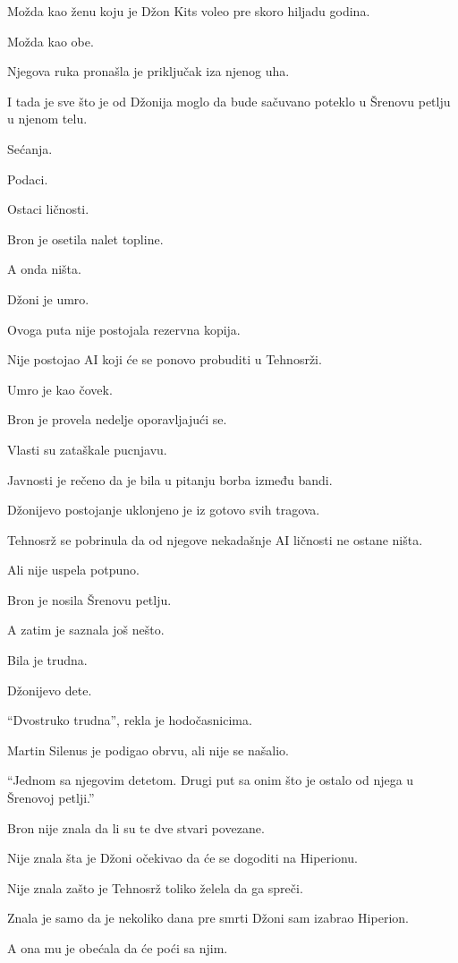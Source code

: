 Možda kao ženu koju je Džon Kits voleo pre skoro hiljadu godina.

Možda kao obe.

Njegova ruka pronašla je priključak iza njenog uha.

I tada je sve što je od Džonija moglo da bude sačuvano poteklo u Šrenovu petlju u njenom telu.

Sećanja.

Podaci.

Ostaci ličnosti.

Bron je osetila nalet topline.

A onda ništa.

Džoni je umro.

Ovoga puta nije postojala rezervna kopija.

Nije postojao AI koji će se ponovo probuditi u Tehnosrži.

Umro je kao čovek.

\bigskip

Bron je provela nedelje oporavljajući se.

Vlasti su zataškale pucnjavu.

Javnosti je rečeno da je bila u pitanju borba između bandi.

Džonijevo postojanje uklonjeno je iz gotovo svih tragova.

Tehnosrž se pobrinula da od njegove nekadašnje AI ličnosti ne ostane ništa.

Ali nije uspela potpuno.

Bron je nosila Šrenovu petlju.

A zatim je saznala još nešto.

Bila je trudna.

Džonijevo dete.

``Dvostruko trudna'', rekla je hodočasnicima.

Martin Silenus je podigao obrvu, ali nije se našalio.

``Jednom sa njegovim detetom. Drugi put sa onim što je ostalo od njega u Šrenovoj petlji.''

Bron nije znala da li su te dve stvari povezane.

Nije znala šta je Džoni očekivao da će se dogoditi na Hiperionu.

Nije znala zašto je Tehnosrž toliko želela da ga spreči.

Znala je samo da je nekoliko dana pre smrti Džoni sam izabrao Hiperion.

A ona mu je obećala da će poći sa njim.

